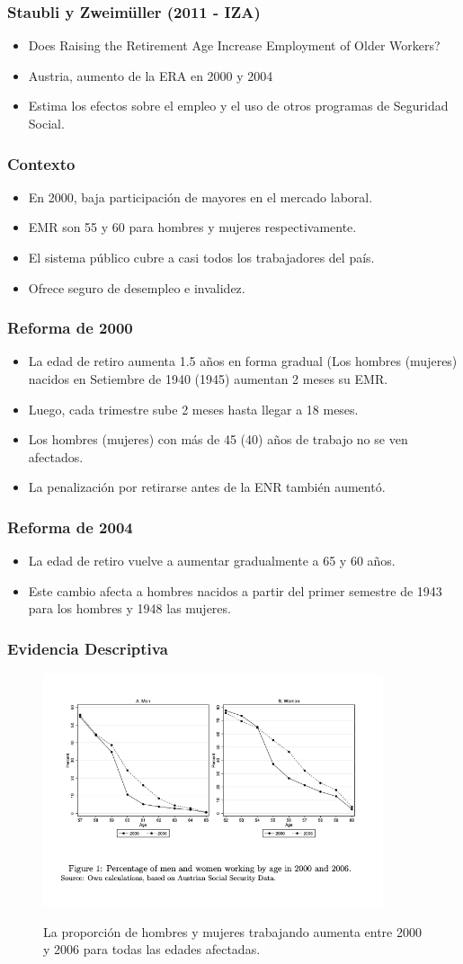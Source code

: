 \documentclass{beamer}
\begin{document}
  \frame
  {
    \frametitle{Staubli y Zweimüller (2011 - IZA)}
    \begin{itemize}
    \item Does Raising the Retirement Age Increase Employment of Older Workers?
    \item Austria, aumento de la ERA en 2000 y 2004
    \item Estima los efectos sobre el empleo y el uso de otros programas de Seguridad Social.
    \end{itemize}
  }
  \frame
  {
    \frametitle{Contexto}
    \begin{itemize}
    \item En 2000, baja participación de mayores en el mercado laboral.
    \item EMR son 55 y 60 para hombres y mujeres respectivamente.
    \item El sistema público cubre a casi todos los trabajadores del país.
    \item Ofrece seguro de desempleo e invalidez.
    \end{itemize}
  }
  \frame
  {
    \frametitle{Reforma de 2000}
    \begin{itemize}
    \item La edad de retiro aumenta 1.5 años en forma gradual (Los hombres (mujeres) nacidos en Setiembre de 1940 (1945) aumentan 2 meses su EMR.
    \item Luego, cada trimestre sube 2 meses hasta llegar a 18 meses.
    \item Los hombres (mujeres) con más de 45 (40) años de trabajo no se ven afectados.
    \item La penalización por retirarse antes de la ENR también aumentó.
    \end{itemize}
  }
    \frame
  {
    \frametitle{Reforma de 2004}
    \begin{itemize}
    \item La edad de retiro vuelve a aumentar gradualmente a 65 y 60 años.
 
    \item Este cambio afecta a hombres nacidos a partir del primer semestre de  1943 para los hombres y 1948 las mujeres.
    \end{itemize}
  }
  \frame
  {
    \frametitle{Evidencia Descriptiva}
      \begin{figure}[htp]
        \centering
        \includegraphics[width=10cm]{imgs/staubli-fig1}
        \label{fig:fig2}
        \caption{La proporción de hombres y mujeres trabajando aumenta entre 2000 y 2006 para todas las edades afectadas.}
      \end{figure}
  }
\end{document}
